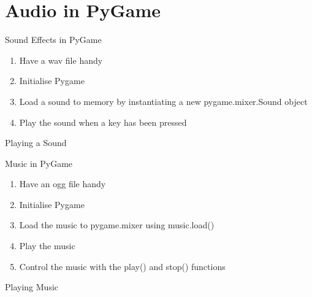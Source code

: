\part{Audio in PyGame}
\frame{\partpage}

\begin{frame}{Sound Effects in PyGame}
	\begin{enumerate}
		\item Have a wav file handy
		\item Initialise Pygame
		\item Load a sound to memory by instantiating a new pygame.mixer.Sound object
		\item Play the sound when a key has been pressed
	\end{enumerate}
\end{frame}

\begin{frame}{Playing a Sound}

\end{frame}

\begin{frame}{Music in PyGame}
	\begin{enumerate}
		\item Have an ogg file handy
		\item Initialise Pygame
		\item Load the music to pygame.mixer using music.load()
		\item Play the music
		\item Control the music with the play() and stop() functions
	\end{enumerate}
\end{frame}

\begin{frame}{Playing Music}

\end{frame}